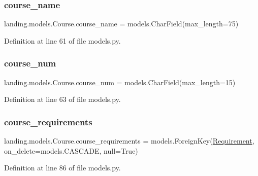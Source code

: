 \subsubsection{\texorpdfstring{course\+\_\+name}{course\_name}}
{\footnotesize\ttfamily landing.\+models.\+Course.\+course\+\_\+name = models.\+Char\+Field(max\+\_\+length=75)\hspace{0.3cm}{\ttfamily [static]}}



Definition at line 61 of file models.\+py.

\mbox{\label{classlanding_1_1models_1_1Course_aa0134d6ca4ef236142fb0ac7670732a7}} 
\subsubsection{\texorpdfstring{course\+\_\+num}{course\_num}}
{\footnotesize\ttfamily landing.\+models.\+Course.\+course\+\_\+num = models.\+Char\+Field(max\+\_\+length=15)\hspace{0.3cm}{\ttfamily [static]}}



Definition at line 63 of file models.\+py.

\mbox{\label{classlanding_1_1models_1_1Course_a8d2a4c6f59aefe907d9d9cbd84a5ac5b}} 
\subsubsection{\texorpdfstring{course\+\_\+requirements}{course\_requirements}}
{\footnotesize\ttfamily landing.\+models.\+Course.\+course\+\_\+requirements = models.\+Foreign\+Key(\mbox{\hyperlink{classlanding_1_1models_1_1Requirement}{Requirement}}, on\+\_\+delete=models.\+C\+A\+S\+C\+A\+DE, null=True)\hspace{0.3cm}{\ttfamily [static]}}



Definition at line 86 of file models.\+py.


